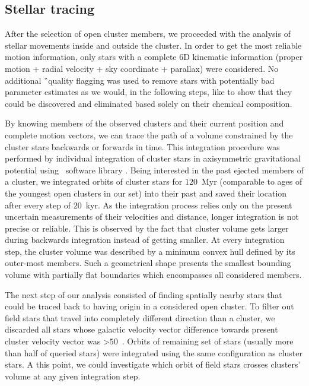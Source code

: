 \subsection{Stellar tracing}
\label{sec:orbit_tracing}
After the selection of open cluster members, we proceeded with the analysis of stellar movements inside and outside the cluster. In order to get the most reliable motion information, only stars with a complete 6D kinematic information (proper motion + radial velocity + sky coordinate + parallax) were considered. No additional \G\ quality flagging was used to remove stars with potentially bad parameter estimates as we would, in the following steps, like to show that they could be discovered and eliminated based solely on their chemical composition.

By knowing members of the observed clusters and their current position and complete motion vectors, we can trace the path of a volume constrained by the cluster stars backwards or forwards in time. This integration procedure was performed by individual integration of cluster stars in axisymmetric gravitational potential \citep[\textit{MWPotential2014} potential,][]{2015ApJS..216...29B} using \GP\ software library \citep[version 1.5.0.,][]{2015ApJS..216...29B}. Being interested in the past ejected members of a cluster, we integrated orbits of cluster stars for $120$~Myr (comparable to ages of the youngest open clusters in our set) into their past and saved their location after every step of $20$~kyr. As the integration process relies only on the present uncertain measurements of their velocities and distance, longer integration is not precise or reliable. This is observed by the fact that cluster volume gets larger during backwards integration instead of getting smaller. At every integration step, the cluster volume was described by a minimum convex hull defined by its outer-most members. Such a geometrical shape presents the smallest bounding volume with partially flat boundaries which encompasses all considered members.

The next step of our analysis consisted of finding spatially nearby stars that could be traced back to having origin in a considered open cluster. To filter out field stars that travel into completely different direction than a cluster, we discarded all stars whose galactic velocity vector difference towards present cluster velocity vector was >$50$~\kms.  Orbits of remaining set of stars (usually more than half of queried stars) were integrated using the same configuration as cluster stars. A this point, we could investigate which orbit of field stars crosses clusters' volume at any given integration step.

